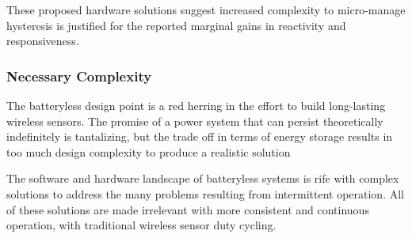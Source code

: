 

These proposed hardware solutions suggest increased complexity to micro-manage hysteresis is justified for the reported marginal gains in reactivity and responsiveness.



\subsubsection{Necessary Complexity}
The batteryless design point is a red herring in the effort to build long-lasting wireless sensors. The promise of a power system that can persist theoretically indefinitely is tantalizing, but the trade off in terms of energy storage results in too much design complexity to produce a realistic solution

The software and hardware landscape of batteryless systems is rife with complex solutions to address the many problems resulting from intermittent operation. All of these solutions are made irrelevant with more consistent and continuous operation, with traditional wireless sensor duty cycling. 

